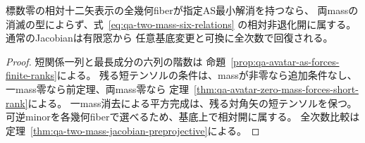 \begin{corollary}[指定AS表示の相対有限窓の認識]
標数零の相対十二矢表示の全幾何fiberが指定AS最小解消を持つなら、
両massの消滅の型によらず、式~\eqref{eq:qa-two-mass-six-relations}
の相対非退化開に属する。通常のJacobianは有限窓から
任意基底変更と可換に全次数で回復される。
\end{corollary}
\begin{proof}
短関係一列と最長成分の六列の階数は
命題~\ref{prop:qa-avatar-as-forces-finite-ranks}による。
残る短テンソルの条件は、massが非零なら追加条件なし、
一mass零なら前定理、両mass零なら
定理~\ref{thm:qa-avatar-zero-mass-forces-short-rank}による。
一mass消去による平方完成は、残る対角矢の短テンソルを保つ。
可逆minorを各幾何fiberで選べるため、基底上で相対開に属する。
全次数比較は定理~\ref{thm:qa-two-mass-jacobian-preprojective}による。
\end{proof}

